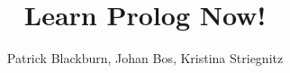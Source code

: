 \documentclass[12pt]{book}
\begin{document}
\title{Learn Prolog Now!}
\author{Patrick Blackburn,
Johan Bos,
Kristina Striegnitz}
\maketitle

\tableofcontents
























\end{document}
